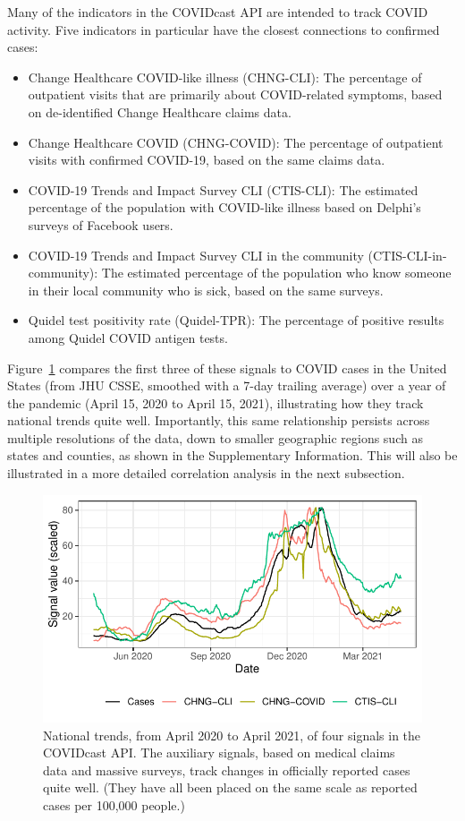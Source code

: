 \documentclass[11pt]{article}
\begin{document}
Many of the indicators in the COVIDcast API are intended to track COVID
activity. Five indicators in particular have the closest connections to
confirmed cases:

\begin{itemize}
\item Change Healthcare COVID-like illness (CHNG-CLI): The percentage of
  outpatient visits that are primarily about COVID-related symptoms, based on
  de-identified Change Healthcare claims data.
\item Change Healthcare COVID (CHNG-COVID): The percentage of outpatient visits
  with confirmed COVID-19, based on the same claims data.
\item COVID-19 Trends and Impact Survey CLI (CTIS-CLI): The estimated percentage
  of the population with COVID-like illness based on Delphi's surveys of
  Facebook users.
\item COVID-19 Trends and Impact Survey CLI in the community
  (CTIS-CLI-in-community): The estimated percentage of the population who know
  someone in their local community who is sick, based on the same surveys.
\item Quidel test positivity rate (Quidel-TPR): The percentage of positive
  results among Quidel COVID antigen tests.
\end{itemize}

Figure~\ref{fig:time_trends_national} compares the first three of these signals
to COVID cases in the United States (from JHU CSSE, smoothed with a 7-day
trailing average) over a year of the pandemic (April 15, 2020 to April 15,
2021), illustrating how they track national trends quite well. Importantly, this
same relationship persists across multiple resolutions of the data, down to
smaller geographic regions such as states and counties, as shown in the
Supplementary Information. This will also be illustrated in a more detailed
correlation analysis in the next subsection.

\begin{figure}[t]
  \centering
  \includegraphics[width=0.6\columnwidth]{fig/time_trends_national.pdf}
  \caption{National trends, from April 2020 to April 2021, of four signals in
    the COVIDcast API. The auxiliary signals, based on medical claims data and
    massive surveys, track changes in officially reported cases quite
    well. (They have all been placed on the same scale as reported cases per
    100,000 people.)}
  \label{fig:time_trends_national}
\end{figure}
\end{document}
